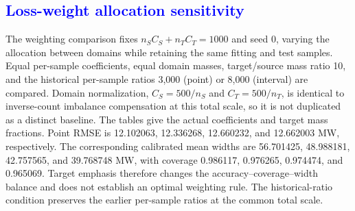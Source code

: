 \subsection{\textcolor{blue}{Loss-weight allocation sensitivity}}
{\color{blue}The weighting comparison fixes $n_SC_S+n_TC_T=1000$ and seed 0, varying the allocation between domains while retaining the same fitting and test samples. Equal per-sample coefficients, equal domain masses, target/source mass ratio 10, and the historical per-sample ratios 3,000 (point) or 8,000 (interval) are compared. Domain normalization, $C_S=500/n_S$ and $C_T=500/n_T$, is identical to inverse-count imbalance compensation at this total scale, so it is not duplicated as a distinct baseline. The tables give the actual coefficients and target mass fractions. Point RMSE is 12.102063, 12.336268, 12.660232, and 12.662003 MW, respectively. The corresponding calibrated mean widths are 56.701425, 48.988181, 42.757565, and 39.768748 MW, with coverage 0.986117, 0.976265, 0.974474, and 0.965069. Target emphasis therefore changes the accuracy--coverage--width balance and does not establish an optimal weighting rule. The historical-ratio condition preserves the earlier per-sample ratios at the common total scale.}

\begin{table}[pos=htbp]
\centering
\color{blue}
\small
\caption{\textcolor{blue}{Weighting sensitivity at matched total loss weight; seed 0. Domain normalization and imbalance compensation are the same configuration at this scale.}}
\label{tab:chronological_weighting_point}
\end{table}

